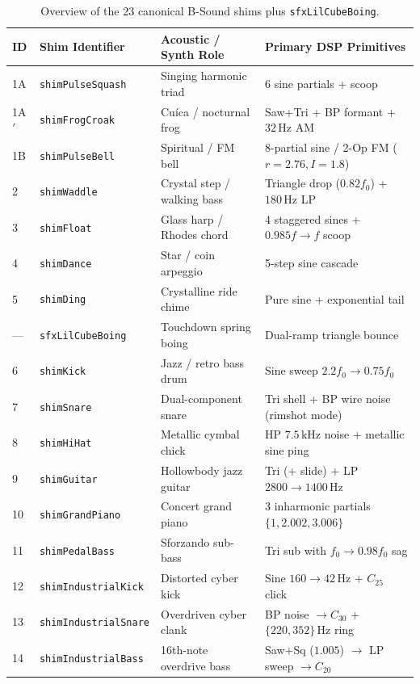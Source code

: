 \begin{table}[htbp]
\centering
\caption{Overview of the 23 canonical B-Sound shims plus \texttt{sfxLilCubeBoing}.}
\label{tab:23-shims}
\scriptsize
\begin{tabular}{@{}llll@{}}
\toprule
ID & Shim Identifier & Acoustic / Synth Role & Primary DSP Primitives \\
\midrule
1A & \texttt{shimPulseSquash} & Singing harmonic triad & 6 sine partials + scoop \\
1A$'$ & \texttt{shimFrogCroak} & Cu\'ica / nocturnal frog & Saw+Tri + BP formant + $32\,\text{Hz}$ AM \\
1B & \texttt{shimPulseBell} & Spiritual / FM bell & 8-partial sine / 2-Op FM ($r=2.76, I=1.8$) \\
2 & \texttt{shimWaddle} & Crystal step / walking bass & Triangle drop ($0.82f_0$) + $180\,\text{Hz}$ LP \\
3 & \texttt{shimFloat} & Glass harp / Rhodes chord & 4 staggered sines + $0.985f \to f$ scoop \\
4 & \texttt{shimDance} & Star / coin arpeggio & 5-step sine cascade \\
5 & \texttt{shimDing} & Crystalline ride chime & Pure sine + exponential tail \\
--- & \texttt{sfxLilCubeBoing} & Touchdown spring boing & Dual-ramp triangle bounce \\
6 & \texttt{shimKick} & Jazz / retro bass drum & Sine sweep $2.2f_0 \to 0.75f_0$ \\
7 & \texttt{shimSnare} & Dual-component snare & Tri shell + BP wire noise (rimshot mode) \\
8 & \texttt{shimHiHat} & Metallic cymbal chick & HP $7.5\,\text{kHz}$ noise + metallic sine ping \\
9 & \texttt{shimGuitar} & Hollowbody jazz guitar & Tri (+ slide) + LP $2800 \to 1400\,\text{Hz}$ \\
10 & \texttt{shimGrandPiano} & Concert grand piano & 3 inharmonic partials $\{1, 2.002, 3.006\}$ \\
11 & \texttt{shimPedalBass} & Sforzando sub-bass & Tri sub with $f_0 \to 0.98f_0$ sag \\
12 & \texttt{shimIndustrialKick} & Distorted cyber kick & Sine $160 \to 42\,\text{Hz}$ + $C_{25}$ click \\
13 & \texttt{shimIndustrialSnare} & Overdriven cyber clank & BP noise $\to C_{30}$ + $\{220, 352\}\,\text{Hz}$ ring \\
14 & \texttt{shimIndustrialBass} & 16th-note overdrive bass & Saw+Sq ($1.005$) $\to$ LP sweep $\to C_{20}$ \\

\end{tabular}
\end{table}
